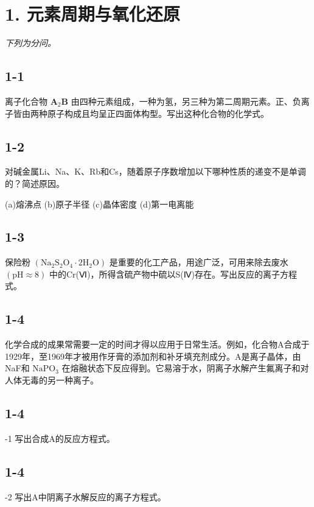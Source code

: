 \section*{1. 元素周期与氧化还原}
\textit{下列为分问。}

\subsection*{1-1}
离⼦化合物 $\mathbf { A } _ { 2 } \mathbf { B }$ 由四种元素组成，⼀种为氢，另三种为第⼆周期元素。正、负离⼦皆由两种原⼦构成且均呈正四⾯体构型。写出这种化合物的化学式。

\subsection*{1-2}
对碱⾦属Li、Na、K、Rb和Cs，随着原⼦序数增加以下哪种性质的递变不是单调的？简述原因。

(a)熔沸点 (b)原⼦半径 (c)晶体密度 (d)第⼀电离能

\subsection*{1-3}
保险粉 $\mathrm { ( N a _ { 2 } S _ { 2 } O _ { 4 } { \cdot } 2 H _ { 2 } O ) }$ 是重要的化⼯产品，⽤途⼴泛，可⽤来除去废⽔ $\mathrm { ( p H \approx 8 ) }$ 中的Cr(Ⅵ)，所得含硫产物中硫以S(Ⅳ)存在。写出反应的离⼦⽅程式。

\subsection*{1-4}
化学合成的成果常需要⼀定的时间才得以应⽤于⽇常⽣活。例如，化合物A合成于1929年，⾄1969年才被⽤作⽛膏的添加剂和补⽛填充剂成分。A是离⼦晶体，由NaF和 $\mathrm { N a P O _ { 3 } }$ 在熔融状态下反应得到。它易溶于⽔，阴离⼦⽔解产⽣氟离⼦和对⼈体⽆毒的另⼀种离⼦。

\subsection*{1-4}
-1 写出合成A的反应⽅程式。

\subsection*{1-4}
-2 写出A中阴离⼦⽔解反应的离⼦⽅程式。
